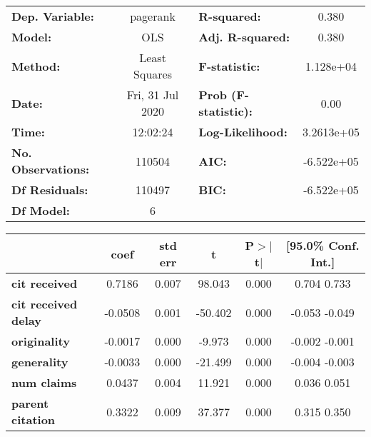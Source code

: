 \begin{center}
\begin{tabular}{lclc}
\toprule
\textbf{Dep. Variable:}     &     pagerank     & \textbf{  R-squared:         } &       0.380    \\
\textbf{Model:}             &       OLS        & \textbf{  Adj. R-squared:    } &       0.380    \\
\textbf{Method:}            &  Least Squares   & \textbf{  F-statistic:       } &   1.128e+04    \\
\textbf{Date:}              & Fri, 31 Jul 2020 & \textbf{  Prob (F-statistic):} &       0.00     \\
\textbf{Time:}              &     12:02:24     & \textbf{  Log-Likelihood:    } &   3.2613e+05   \\
\textbf{No. Observations:}  &      110504      & \textbf{  AIC:               } &   -6.522e+05   \\
\textbf{Df Residuals:}      &      110497      & \textbf{  BIC:               } &   -6.522e+05   \\
\textbf{Df Model:}          &           6      & \textbf{                     } &                \\
\bottomrule
\end{tabular}
\begin{tabular}{lccccc}
                            & \textbf{coef} & \textbf{std err} & \textbf{t} & \textbf{P$>$$|$t$|$} & \textbf{[95.0\% Conf. Int.]}  \\
\midrule
\textbf{cit received}       &       0.7186  &        0.007     &    98.043  &         0.000        &         0.704     0.733       \\
\textbf{cit received delay} &      -0.0508  &        0.001     &   -50.402  &         0.000        &        -0.053    -0.049       \\
\textbf{originality}        &      -0.0017  &        0.000     &    -9.973  &         0.000        &        -0.002    -0.001       \\
\textbf{generality}         &      -0.0033  &        0.000     &   -21.499  &         0.000        &        -0.004    -0.003       \\
\textbf{num claims}         &       0.0437  &        0.004     &    11.921  &         0.000        &         0.036     0.051       \\
\textbf{parent citation}    &       0.3322  &        0.009     &    37.377  &         0.000        &         0.315     0.350       \\

\end{tabular}
\end{center}
